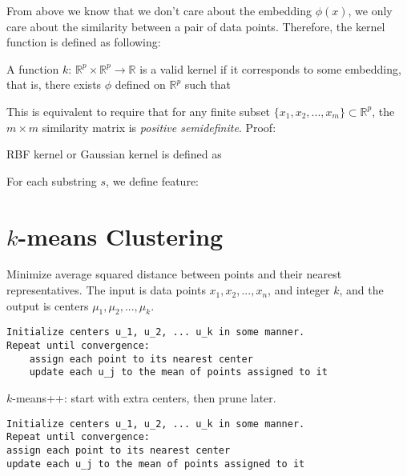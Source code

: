  From above we know that we don't care about the embedding $\phi(x)$, we only 
care about the similarity between a pair of data points. Therefore, the kernel function is defined as following:
\vspace{0.5cm}
\begin{definition}
    A function $k$: $\mathbb{R}^p \times \mathbb{R}^p \rightarrow \mathbb{R}$ is a valid kernel if it corresponds to some embedding, that is, there exists $\phi$ defined on $\mathbb{R}^p$ such that
\end{definition}

This is equivalent to require that for any finite subset $\{x_1, x_2, ..., x_m\} \subset \mathbb{R}^p$,
the $m \times m$ similarity matrix 
is \textit{positive semidefinite}. Proof:

RBF kernel or Gaussian kernel is defined as

For each substring $s$, we define feature:


\section{$k$-means Clustering}
 Minimize average squared distance between points and their nearest representatives.
The input is data points $x_1, x_2, ..., x_n$, and integer $k$, and the output is centers
$\mu_1, \mu_2, ..., \mu_k$.

\begin{verbatim}
Initialize centers u_1, u_2, ... u_k in some manner.
Repeat until convergence:
    assign each point to its nearest center
    update each u_j to the mean of points assigned to it
\end{verbatim}

 $k$-means++: start with extra centers, then prune later.

\begin{verbatim}
Initialize centers u_1, u_2, ... u_k in some manner.
Repeat until convergence:
assign each point to its nearest center
update each u_j to the mean of points assigned to it
\end{verbatim}













